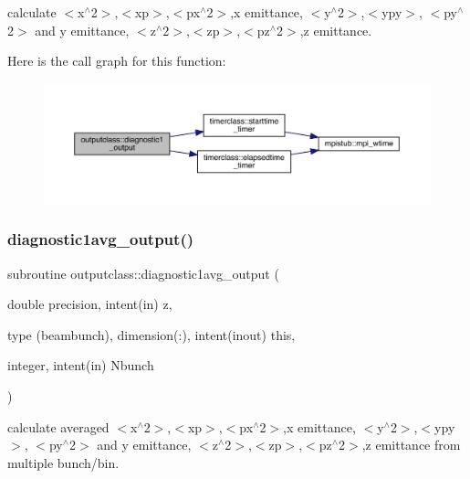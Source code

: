 calculate $<$x$^\wedge$2$>$,$<$xp$>$,$<$px$^\wedge$2$>$,x emittance, $<$y$^\wedge$2$>$,$<$ypy$>$, $<$py$^\wedge$2$>$ and y emittance, $<$z$^\wedge$2$>$,$<$zp$>$,$<$pz$^\wedge$2$>$,z emittance. 

Here is the call graph for this function\+:\nopagebreak
\begin{figure}[H]
\begin{center}
\leavevmode
\includegraphics[width=350pt]{namespaceoutputclass_a3b5a43f1652254e5a12880dc332a48c3_cgraph}
\end{center}
\end{figure}
\mbox{\label{namespaceoutputclass_ac91c3984014cb5cdc000c0422ccd08a1}} 
\subsubsection{\texorpdfstring{diagnostic1avg\_output()}{diagnostic1avg\_output()}}
{\footnotesize\ttfamily subroutine outputclass\+::diagnostic1avg\+\_\+output (\begin{DoxyParamCaption}\item[{double precision, intent(in)}]{z,  }\item[{type (beambunch), dimension(\+:), intent(inout)}]{this,  }\item[{integer, intent(in)}]{Nbunch }\end{DoxyParamCaption})}



calculate averaged $<$x$^\wedge$2$>$,$<$xp$>$,$<$px$^\wedge$2$>$,x emittance, $<$y$^\wedge$2$>$,$<$ypy$>$, $<$py$^\wedge$2$>$ and y emittance, $<$z$^\wedge$2$>$,$<$zp$>$,$<$pz$^\wedge$2$>$,z emittance from multiple bunch/bin. 


